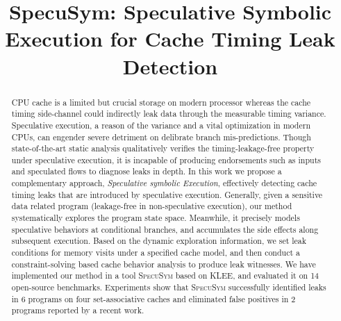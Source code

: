 \documentclass[sigconf, review]{acmart}
\newcommand\ignore[1]{}
\newcommand{\SpecuSym}{\textsc{SpecuSym} }
\begin{document}
\setlength{\abovedisplayskip}{3pt}
\setlength{\belowdisplayskip}{3pt}

\title[]{SpecuSym: Speculative Symbolic Execution for Cache Timing Leak Detection}

\ignore{
  \author{xxx}
  \affiliation{%
    \institution{Baidu X-Lab}
    \city{Sunnyvale}
    \state{CA}
    \postcode{95134}
  }
}



\begin{abstract}
  CPU cache is a limited but crucial storage on modern processor whereas the 
  cache timing side-channel could indirectly leak data through the measurable 
  timing variance. Speculative execution, a reason of the variance and a vital 
  optimization in modern CPUs, can engender severe detriment on delibrate branch 
  mis-predictions.
  Though state-of-the-art static analysis qualitatively verifies the 
	timing-leakage-free property under speculative execution, it is incapable 
  of producing endorsements such as inputs and speculated flows to diagnose 
  leaks in depth. 
	In this work we propose a complementary approach, \textit{Speculative symbolic 
  Execution}, effectively detecting cache timing leaks that are introduced by speculative 
  execution. Generally, given a sensitive data related program 
  (leakage-free in non-speculative execution), our method systematically explores 
  the program state space. Meanwhile, it precisely models speculative behaviors 
  at conditional branches, and accumulates the side effects along subsequent 
  execution. Based on the dynamic exploration information, we set leak conditions 
  for memory visits under a specified cache model, and then conduct a constraint-solving 
  based cache behavior analysis to produce leak witnesses.
  We have implemented our method in a tool \SpecuSym based on KLEE, and evaluated 
  it on 14 open-source benchmarks. Experiments show that \SpecuSym successfully
  identified leaks in 6 programs on four set-associative caches and eliminated 
  false positives in 2 programs reported by a recent work.
\end{abstract}

\maketitle
\end{document}
